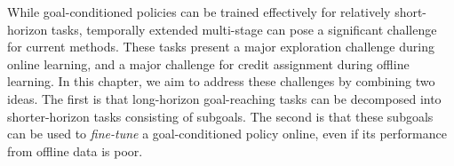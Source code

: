 While goal-conditioned policies can be trained effectively for relatively short-horizon tasks, temporally extended multi-stage can pose a significant challenge for current methods. These tasks present a major exploration challenge during online learning, and a major challenge for credit assignment during offline learning.
In this chapter, we aim to address these challenges by combining two ideas. The first is that long-horizon goal-reaching tasks can be decomposed into shorter-horizon tasks consisting of subgoals. The second is that these subgoals can be used to \emph{fine-tune} a goal-conditioned policy online, even if its performance from offline data is poor.
